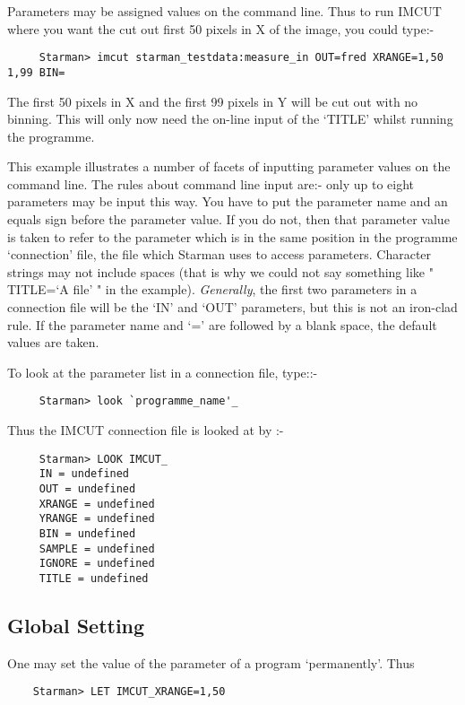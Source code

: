 Parameters may be assigned values on the command line. Thus to run IMCUT
where you want the cut out first 50 pixels in X of the image, you could
type:-
\begin{verbatim}
     Starman> imcut starman_testdata:measure_in OUT=fred XRANGE=1,50 1,99 BIN= 
\end{verbatim}

The first 50 pixels in X and the first 99 pixels in Y will be cut out with
no binning. This will only now need the on-line input of the `TITLE' whilst
running the programme. 

This example illustrates a number of facets of inputting parameter values on the
command line. The rules about command line input are:- only up to eight 
parameters may be input this way. You have to put the parameter name and an 
equals sign before the parameter value. If you do not, then that parameter 
value is taken to refer to the parameter which is in the same position in 
the programme `connection' file, the file which Starman uses to access 
parameters. Character strings may not include spaces
(that is why we could not say something like " TITLE=`A file' " in the 
example). {\em Generally}, the first two parameters in a connection file
will be the `IN' and `OUT' parameters, but this is not an iron-clad rule.
If the parameter name and `=' are followed by a blank space, the default
values are taken.

To look at the parameter list in a connection file, type::-
\begin{verbatim}
     Starman> look `programme_name'_
\end{verbatim}

Thus the IMCUT connection file is looked at by :-
\begin{verbatim}
     Starman> LOOK IMCUT_
     IN = undefined
     OUT = undefined
     XRANGE = undefined
     YRANGE = undefined
     BIN = undefined
     SAMPLE = undefined
     IGNORE = undefined
     TITLE = undefined
\end{verbatim}

\subsection{Global Setting}

One may set the value of the parameter of a program `permanently'. Thus
\begin{verbatim}
    Starman> LET IMCUT_XRANGE=1,50
\end{verbatim}

